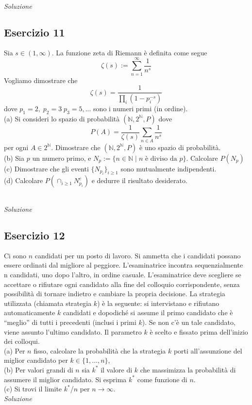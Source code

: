 \textit{Soluzione} \quad

\subsection{Esercizio 11} 
Sia $s \in  (1, \infty)$. La funzione zeta di Riemann è definita come segue
\[\zeta(s):=\sum_{n=1}^{\infty}\frac{1}{n^s}\]
Vogliamo dimostrare che 
\[\zeta(s)=\frac{1}{\prod_i(1-p_i^{-s})}\]
dove $p_1=2,\; p_2=3\; p_3=5,...$ sono i numeri primi (in ordine). \\
(a) Si consideri lo spazio di probabilità $(\mathbb{N}, 2^{\mathbb{N}}, P)$ dove 
\[P(A)=\frac{1}{\zeta(s)}\sum_{n\in A}\frac{1}{n^s}\]
per ogni $A\in 2^{\mathbb{N}}$. Dimostrare che $(\mathbb{N}, 2^{\mathbb{N}}, P)$ è uno spazio di probabilità. \\
(b) Sia $p$ un numero primo, e $N_p:=\{n \in \mathbb{N} \mid n \text{ è diviso da } p\}$. Calcolare $P(N_p)$ \\
(c) Dimostrare che gli eventi $\{N_{p_i}\}_{i\geq 1}$ sono mutualmente indipendenti. \\
(d) Calcolare $P(\cap_{i \geq 1} N^c_{p_i})$ e dedurre il risultato desiderato.


\\

\textit{Soluzione} \quad

\subsection{Esercizio 12} 
Ci sono $n$ candidati per un posto di lavoro. Si ammetta che i candidati possano essere ordinati dal migliore al peggiore. L’esaminatrice incontra sequenzialmente n candidati, uno dopo l’altro, in ordine casuale. L’esaminatrice deve scegliere se accettare o rifiutare ogni candidato alla fine del colloquio corrispondente, senza possibilità di tornare indietro e cambiare la propria decisione. La strategia utilizzata (chiamata strategia $k$) è la seguente: si intervistano e rifiutano automaticamente $k$ candidati e dopodiché si assume il primo candidato che è “meglio” di tutti i precedenti (inclusi i primi $k$). Se non c’è un tale candidato, viene assunto l’ultimo candidato. Il parametro $k$ è scelto e fissato prima dell’inizio dei colloqui. \\
(a) Per $n$ fisso, calcolare la probabilità che la strategia $k$ porti all’assunzione del miglior candidato per $k\in \{1,...,n\}$, \\
(b) Per valori grandi di $n$ sia $k^*$ il valore di $k$ che massimizza la probabilità di assumere il miglior candidato. Si esprima $k^*$ come funzione di $n$.  \\
(c) Si trovi il limite $k^*$/$n$ per $n \to \infty$.
\\

\textit{Soluzione} \quad
